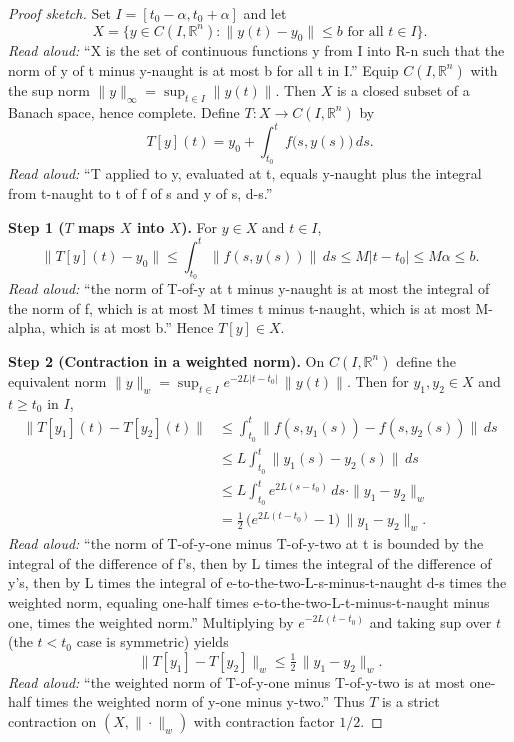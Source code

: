 \documentclass[11pt]{article}
\theoremstyle{definition}
\theoremstyle{remark}
\newcommand{\R}{\mathbb{R}}
\begin{document}
\begin{proof}[Proof sketch]
  Set $I = [t_0 - \alpha, t_0 + \alpha]$ and let
  \[
    X = \{ y \in C(I, \R^n) : \|y(t) - y_0\| \le b \text{ for all } t \in I \}.
  \]
  \emph{Read aloud:} ``X is the set of continuous functions y from I into
  R-n such that the norm of y of t minus y-naught is at most b for all t
  in I.''
  Equip $C(I, \R^n)$ with the sup norm $\|y\|_\infty = \sup_{t \in I}\|y(t)\|$.
  Then $X$ is a closed subset of a Banach space, hence complete. Define
  $T : X \to C(I, \R^n)$ by
  \[
    T[y](t) = y_0 + \int_{t_0}^t f\bigl(s, y(s)\bigr)\, ds.
  \]
  \emph{Read aloud:} ``T applied to y, evaluated at t, equals y-naught plus
  the integral from t-naught to t of f of s and y of s, d-s.''

  \textbf{Step 1 ($T$ maps $X$ into $X$).} For $y \in X$ and $t \in I$,
  \[
    \|T[y](t) - y_0\| \le \int_{t_0}^t \|f(s, y(s))\|\, ds
    \le M |t - t_0| \le M\alpha \le b.
  \]
  \emph{Read aloud:} ``the norm of T-of-y at t minus y-naught is at most
  the integral of the norm of f, which is at most M times t minus t-naught,
  which is at most M-alpha, which is at most b.''
  Hence $T[y] \in X$.

  \textbf{Step 2 (Contraction in a weighted norm).} On $C(I, \R^n)$ define
  the equivalent norm
  $\|y\|_w = \sup_{t \in I} e^{-2L|t - t_0|}\, \|y(t)\|.$
  Then for $y_1, y_2 \in X$ and $t \ge t_0$ in $I$,
  \begin{align*}
    \|T[y_1](t) - T[y_2](t)\|
      &\le \int_{t_0}^t \|f(s, y_1(s)) - f(s, y_2(s))\| \, ds \\
      &\le L \int_{t_0}^t \|y_1(s) - y_2(s)\| \, ds \\
      &\le L \int_{t_0}^t e^{2L(s-t_0)}\, ds \cdot \|y_1 - y_2\|_w \\
      &= \tfrac{1}{2}\, \bigl(e^{2L(t-t_0)} - 1\bigr)\, \|y_1 - y_2\|_w.
  \end{align*}
  \emph{Read aloud:} ``the norm of T-of-y-one minus T-of-y-two at t is
  bounded by the integral of the difference of f's, then by L times the
  integral of the difference of y's, then by L times the integral of
  e-to-the-two-L-s-minus-t-naught d-s times the weighted norm, equaling
  one-half times e-to-the-two-L-t-minus-t-naught minus one, times the
  weighted norm.''
  Multiplying by $e^{-2L(t-t_0)}$ and taking sup over $t$ (the $t < t_0$
  case is symmetric) yields
  \[
    \|T[y_1] - T[y_2]\|_w \le \tfrac{1}{2}\, \|y_1 - y_2\|_w.
  \]
  \emph{Read aloud:} ``the weighted norm of T-of-y-one minus T-of-y-two is
  at most one-half times the weighted norm of y-one minus y-two.''
  Thus $T$ is a strict contraction on $(X, \|\cdot\|_w)$ with contraction
  factor $1/2$.


\end{proof}
\end{document}
